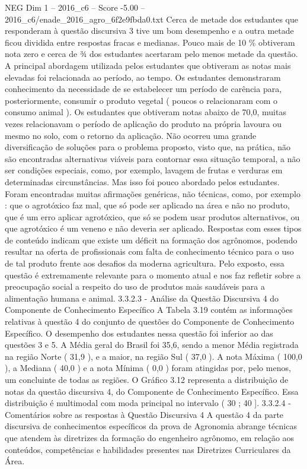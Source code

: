 \begin{textsample}{NEG Dim 1 – 2016\_c6 – Score -5.00 – 2016\_c6/enade\_2016\_agro\_6f2e9fbda0.txt}
Cerca de metade dos estudantes que responderam à questão discursiva 3 tive um bom desempenho e a outra metade ficou dividida entre respostas fracas e medianas.
Pouco mais de 10 \% obtiveram nota zero e cerca de ¾ dos estudantes acertaram pelo menos metade da questão.
A principal abordagem utilizada pelos estudantes que obtiveram as notas mais elevadas foi relacionada ao período, ao tempo.
Os estudantes demonstraram conhecimento da necessidade de se estabelecer um período de carência para, posteriormente, consumir o produto vegetal ( poucos o relacionaram com o consumo animal ).
Os estudantes que obtiveram notas abaixo de 70,0, muitas vezes relacionavam o período de aplicação do produto na própria lavoura ou mesmo no solo, com o retorno da aplicação.
Não ocorreu uma grande diversificação de soluções para o problema proposto, visto que, na prática, não são encontradas alternativas viáveis para contornar essa situação temporal, a não ser condições especiais, como, por exemplo, lavagem de frutas e verduras em determinadas circunstâncias.
Mas isso foi pouco abordado pelos estudantes.
Foram encontradas muitas afirmações genéricas, não técnicas, como, por exemplo : que o agrotóxico faz mal, que só pode ser aplicado na área e não no produto, que é um erro aplicar agrotóxico, que só se podem usar produtos alternativos, ou que agrotóxico é um veneno e não deveria ser aplicado.
Respostas com esses tipos de conteúdo indicam que existe um déficit na formação dos agrônomos, podendo resultar na oferta de profissionais com falta de conhecimento técnico para o uso de tal produto frente aos desafios da moderna agricultura.
Pelo exposto, essa questão é extremamente relevante para o momento atual e nos faz refletir sobre a preocupação social a respeito do uso de produtos mais saudáveis para a alimentação humana e animal. 3.3.2.3 - Análise da Questão Discursiva 4 do Componente de Conhecimento Específico A Tabela 3.19 contém as informações relativas à questão 4 do conjunto de questões do Componente de Conhecimento Específico.
O desempenho dos estudantes nessa questão foi inferior ao das questões 3 e 5.
A Média geral do Brasil foi 35,6, sendo a menor Média registrada na região Norte ( 31,9 ), e a maior, na região Sul ( 37,0 ).
A nota Máxima ( 100,0 ), a Mediana ( 40,0 ) e a nota Mínima ( 0,0 ) foram atingidas por, pelo menos, um concluinte de todas as regiões.
O Gráfico 3.12 representa a distribuição de notas da questão discursiva 4, do Componente de Conhecimento Específico.
Essa distribuição é multimodal com moda principal no intervalo ( 30 ; 40 ]. 3.3.2.4 - Comentários sobre as respostas à Questão Discursiva 4 A questão 4 da parte discursiva de conhecimentos específicos da prova de Agronomia abrange técnicas que atendem às diretrizes da formação do engenheiro agrônomo, em relação aos conteúdos, competências e habilidades presentes nas Diretrizes Curriculares da Área.

\end{textsample}
